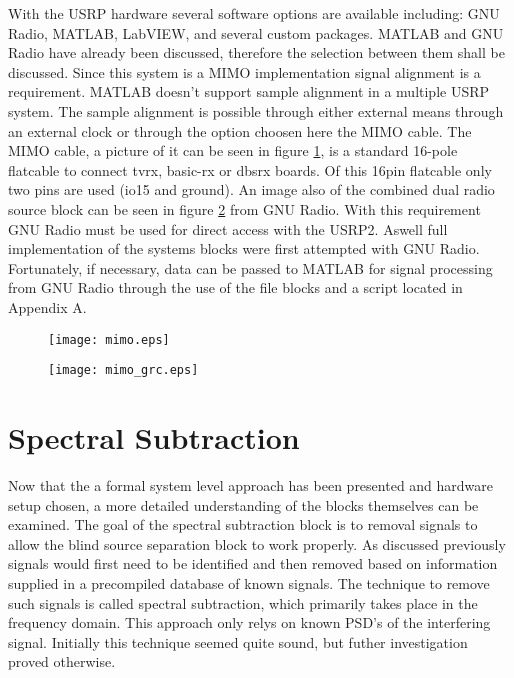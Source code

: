 With the USRP hardware several software options are available including: GNU Radio, MATLAB, LabVIEW, and several custom packages.  MATLAB and GNU Radio have already been discussed, therefore the selection between them shall be discussed.  Since this system is a MIMO implementation signal alignment is a requirement.  MATLAB doesn't support sample alignment in a multiple USRP system.  The sample alignment is possible through either external means through an external clock or through the option choosen here the MIMO cable.  The MIMO cable, a picture of it can be seen in figure \ref{mimo}, is a standard 16-pole flatcable to connect tvrx, basic-rx or dbsrx boards.  Of this 16pin flatcable only two pins are used (io15 and ground)\cite{mimo_cable}.  An image also of the combined dual radio source block can be seen in figure \ref{mimo_grc} from GNU Radio.  With this requirement GNU Radio must be used for direct access with the USRP2.  Aswell full implementation of the systems blocks were first attempted with GNU Radio.  Fortunately, if necessary, data can be passed to MATLAB for signal processing from GNU Radio through the use of the file blocks and a script located in Appendix A.\\

\begin{figure}\label{mimo}
\texttt{[image: mimo.eps]}%
\end{figure} 

\begin{figure}\label{mimo_grc}
\texttt{[image: mimo\_grc.eps]}
\end{figure} 


\section{Spectral Subtraction}

Now that the a formal system level approach has been presented and hardware setup chosen, a more detailed understanding of the blocks themselves can be examined.  The goal of the spectral subtraction block is to removal signals to allow the blind source separation block to work properly.  As discussed previously signals would first need to be identified and then removed based on information supplied in a precompiled database of known signals.  The technique to remove such signals is called spectral subtraction, which primarily takes place in the frequency domain.  This approach only relys on known PSD's of the interfering signal.  Initially this technique seemed quite sound, but futher investigation proved otherwise.\\

